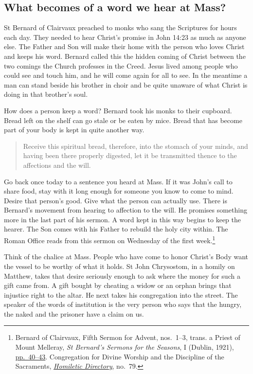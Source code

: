 \subsection{What becomes of a word we hear at Mass?}

St Bernard of Clairvaux preached to monks who sang the Scriptures for
hours each day. They needed to hear Christ's promise in John 14:23 as
much as anyone else. The Father and Son will make their home with the
person who loves Christ and keeps his word. Bernard called this the hidden
coming of Christ between the two comings the Church professes in the
Creed. Jesus lived among people who could see and touch him, and he will
come again for all to see. In the meantime a man can stand beside his
brother in choir and be quite unaware of what Christ is doing in that
brother's soul.

How does a person keep a word? Bernard took his monks to their cupboard.
Bread left on the shelf can go stale or be eaten by mice. Bread that has
become part of your body is kept in quite another way.

\begin{quote}
Receive this spiritual bread, therefore, into the stomach of your minds,
and having been there properly digested, let it be transmitted thence to
the affections and the will.
\end{quote}

Go back once today to a sentence you heard at Mass. If it was John's call
to share food, stay with it long enough for someone you know to come to
mind. Desire that person's good. Give what the person can actually use.
There is Bernard's movement from hearing to affection to the will. He
promises something more in the last part of his sermon. A word kept in
this way begins to keep the hearer. The Son comes with his Father to
rebuild the holy city within. The Roman Office reads from this sermon on
Wednesday of the first week.\footnote{Bernard of Clairvaux, Fifth Sermon for
Advent, nos.~1--3, trans. a Priest of Mount Melleray,
\emph{St Bernard's Sermons for the Seasons}, I (Dublin, 1921),
\href{https://archive.org/details/stbernardssermon0001prie_y4z3/page/40/mode/2up}{pp.~40--43}.
Congregation for Divine Worship and the Discipline of the Sacraments,
\href{https://www.usccb.org/resources/Homiletic-Directory-CDWDS.pdf}{\emph{Homiletic Directory}},
no.~79.}

Think of the chalice at Mass. People who have come to honor Christ's Body
want the vessel to be worthy of what it holds. St John Chrysostom, in a
homily on Matthew, takes that desire seriously enough to ask where the money
for such a gift came from. A gift bought by cheating a widow or an orphan
brings that injustice right to the altar. He next takes his congregation
into the street. The speaker of the words of institution is the very person
who says that the hungry, the naked and the prisoner have a claim on us.

